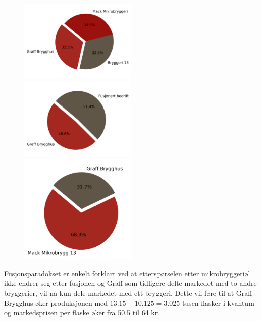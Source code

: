\documentclass[
  12pt,
  a4paper,
  DIV=11,
  numbers=noendperiod]{scrartcl}
\begin{document}
\begin{figure}
  \centering
  \includegraphics[width=0.5\textwidth]{dokumentobjekter/figurer/cournot_mikrobryggerier.png}
  \label{fig:cournot_før_fusjon}
  \includegraphics[width=0.5\textwidth]{dokumentobjekter/figurer/fusjonert_bedrift.png}
  \label{fig:cournot_etter_fusjon}
  \includegraphics[width=0.5\textwidth]{dokumentobjekter/figurer/stackelberg_mack_graff.png}
  \label{fig:stackelberg_etter_fusjon}
  \vspace{-1cm}
\end{figure}

Fusjonsparadokset er enkelt forklart ved at etterspørselen etter
mikrobryggeriøl ikke endrer seg etter fusjonen og Graff som tidligere
delte markedet med to andre bryggerier, vil nå kun dele markedet med ett
bryggeri. Dette vil føre til at Graff Brygghus øker produksjonen med
\(13.15 - 10.125 =  3.025\) tusen flasker i kvantum og markedsprisen per
flaske øker fra 50.5 til 64 kr.
\end{document}
